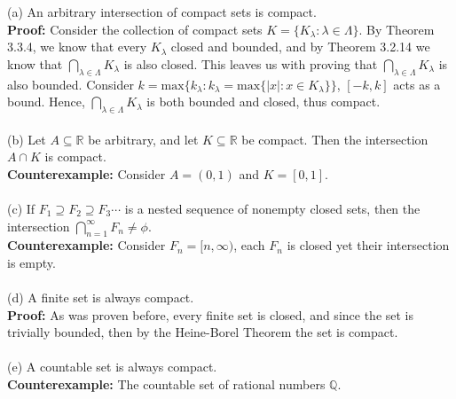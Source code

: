 \documentclass{article}
\begin{document}
	\begin{itemize}
		(a) An arbitrary intersection of compact sets is compact. \\
		\textbf{Proof:} Consider the collection of compact sets $K = \{K_\lambda : \lambda \in \Lambda \}$.
		By Theorem 3.3.4, we know that every $K_\lambda$ closed and bounded, and by Theorem 3.2.14 we know that $\bigcap_{\lambda \in \Lambda} K_\lambda$ is also closed. This leaves us with proving that $\bigcap_{\lambda \in \Lambda} K_\lambda$ is also bounded. Consider $k = \text{max}\{k_\lambda : k_\lambda = \text{max}\{|x| : x \in K_\lambda\}\}$, $[-k, k]$ acts as a bound. Hence, $\bigcap_{\lambda \in \Lambda} K_\lambda$ is both bounded and closed, thus compact. \\ \\
		(b) Let $A \subseteq \mathbb{R}$ be arbitrary, and let $K \subseteq \mathbb{R}$ be compact. Then the intersection $A \cap K$ is compact. \\
		\textbf{Counterexample:} Consider $A = (0, 1)$ and $K = [0, 1]$. \\ \\
		(c) If $F_1 \supseteq F_2 \supseteq F_3 \cdots$ is a nested sequence of nonempty closed sets, then the intersection $\bigcap_{n = 1}^\infty F_n \neq \phi$. \\
		\textbf{Counterexample:} Consider $F_n = [n, \infty)$, each $F_n$ is closed yet their intersection is empty. \\ \\
		(d) A finite set is always compact. \\
		\textbf{Proof:} As was proven before, every finite set is closed, and since the set is trivially bounded, then by the Heine-Borel Theorem the set is compact. \\ \\
		(e) A countable set is always compact. \\
		\textbf{Counterexample:} The countable set of rational numbers $\mathbb{Q}$. \\
	\end{itemize}
\end{document}
